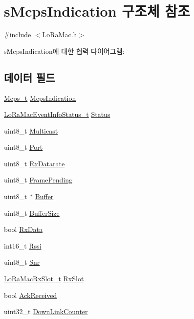 \hypertarget{structs_mcps_indication}{}\section{s\+Mcps\+Indication 구조체 참조}
\label{structs_mcps_indication}


{\ttfamily \#include $<$Lo\+Ra\+Mac.\+h$>$}



s\+Mcps\+Indication에 대한 협력 다이어그램\+:
\subsection*{데이터 필드}
\begin{DoxyCompactItemize}
\item 
\mbox{\hyperlink{group___l_o_r_a_m_a_c_ga670d0c87a52aeb13391f303a4cf94f00}{Mcps\+\_\+t}} \mbox{\hyperlink{structs_mcps_indication_af45477156b4a2e186b2bfa2afb3a4efc}{Mcps\+Indication}}
\item 
\mbox{\hyperlink{group___l_o_r_a_m_a_c_gac6ffc346a4c767f7a743c87a686c51b4}{Lo\+Ra\+Mac\+Event\+Info\+Status\+\_\+t}} \mbox{\hyperlink{structs_mcps_indication_ab360e499d5a7a9e0aa7b4df7239633b5}{Status}}
\item 
uint8\+\_\+t \mbox{\hyperlink{structs_mcps_indication_acbaf0d718e63c5e2ed50a29cdcca27e0}{Multicast}}
\item 
uint8\+\_\+t \mbox{\hyperlink{structs_mcps_indication_a4b93121f04819fbab96346736fa720a9}{Port}}
\item 
uint8\+\_\+t \mbox{\hyperlink{structs_mcps_indication_a61e9e29ca015230436fe420bf88989e9}{Rx\+Datarate}}
\item 
uint8\+\_\+t \mbox{\hyperlink{structs_mcps_indication_a123aed553ea78b5967618c22147a7f4c}{Frame\+Pending}}
\item 
uint8\+\_\+t $\ast$ \mbox{\hyperlink{structs_mcps_indication_a095175dabcb7cd83bddf2bea50371121}{Buffer}}
\item 
uint8\+\_\+t \mbox{\hyperlink{structs_mcps_indication_abf449ca64f34dbb66a7c5bf70fd55753}{Buffer\+Size}}
\item 
bool \mbox{\hyperlink{structs_mcps_indication_afa6d3de110fa10174203ce26682585c9}{Rx\+Data}}
\item 
int16\+\_\+t \mbox{\hyperlink{structs_mcps_indication_ae00742a7fb9199399f4e4d79e42fda78}{Rssi}}
\item 
uint8\+\_\+t \mbox{\hyperlink{structs_mcps_indication_af053995b03762dc0e0cd4d11f7d06d05}{Snr}}
\item 
\mbox{\hyperlink{group___l_o_r_a_m_a_c_ga082bd3322087fa2f42c902a0b360ff4f}{Lo\+Ra\+Mac\+Rx\+Slot\+\_\+t}} \mbox{\hyperlink{structs_mcps_indication_a0a258bf8cfad5219bfd579257e523fc1}{Rx\+Slot}}
\item 
bool \mbox{\hyperlink{structs_mcps_indication_ac59e1bd1c9450c7d136c7f475be89ded}{Ack\+Received}}
\item 
uint32\+\_\+t \mbox{\hyperlink{structs_mcps_indication_a7a566925baf83b1b3da9209dfa4bb79a}{Down\+Link\+Counter}}
\end{DoxyCompactItemize}


